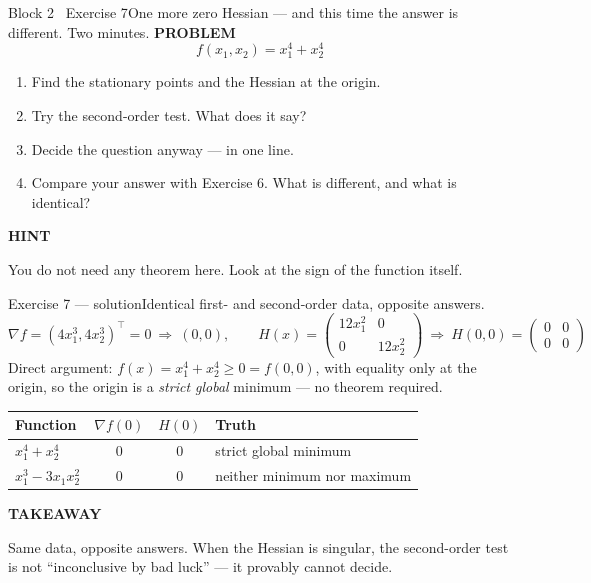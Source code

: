 \documentclass[aspectratio=169,11pt]{beamer}
\newcommand{\kicker}[1]{{\color{hseaccent}\scriptsize\bfseries\MakeUppercase{#1}}}
\newcommand{\takeaway}[2]{%
  \par\smallskip\noindent
  \colorbox{hselight}{\parbox{\dimexpr\textwidth-2\fboxsep}{%
    \kicker{#1}\par\vspace{0.12em}\footnotesize #2}}\par}
\begin{document}
\begin{frame}{Block 2 \textperiodcentered\ Exercise 7}{One more zero Hessian --- and this time the answer is different. Two minutes.}
  \vspace{0.6em}
  \kicker{problem}
  \[ f(x_1,x_2)=x_1^{4}+x_2^{4} \]
  \vspace{-0.5em}
  \begin{enumerate}\small
    \item Find the stationary points and the Hessian at the origin.
    \item Try the second-order test. What does it say?
    \item Decide the question anyway --- in one line.
    \item Compare your answer with Exercise 6. What is different, and what is identical?
  \end{enumerate}
  \vspace{0.5em}
  \takeaway{hint}{You do not need any theorem here. Look at the sign of the function itself.}
\end{frame}

\begin{frame}{Exercise 7 --- solution}{Identical first- and second-order data, opposite answers.}
  \vspace{0.2em}
  \[ \nabla f=(4x_1^{3},4x_2^{3})^{\top}=0\ \Rightarrow\ (0,0),\qquad
    H(x)=\begin{pmatrix}12x_1^{2}&0\\0&12x_2^{2}\end{pmatrix}\ \Rightarrow\
    H(0,0)=\begin{pmatrix}0&0\\0&0\end{pmatrix} \]
  {\small Direct argument: $f(x)=x_1^{4}+x_2^{4}\ge 0=f(0,0)$, with equality only at the origin, so the origin
    is a \emph{strict global} minimum --- no theorem required.}
  \par\medskip
  \begin{center}\small
    \begin{tabular}{@{}l c c l@{}}
      \toprule
      \textbf{Function}     & $\nabla f(0)$ & $H(0)$ & \textbf{Truth}              \\
      \midrule
      $x_1^{4}+x_2^{4}$     & $0$           & $0$    & strict global minimum       \\
      $x_1^{3}-3x_1x_2^{2}$ & $0$           & $0$    & neither minimum nor maximum \\
      \bottomrule
    \end{tabular}
  \end{center}
  \takeaway{takeaway}{Same data, opposite answers. When the Hessian is singular, the second-order test is not
    ``inconclusive by bad luck'' --- it provably cannot decide.}
\end{frame}
\end{document}
